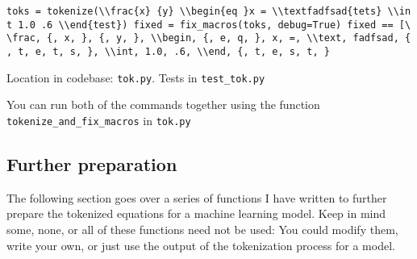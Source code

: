 \documentclass[]{article}
\begin{document}
\texttt{toks\ =\ tokenize(\textquotesingle{}\textbackslash{}\textbackslash{}frac\{x\}\ \{y\}\ \textbackslash{}\textbackslash{}begin\{eq\ \}x\ =\ \textbackslash{}\textbackslash{}textfadfsad\{tets\}\ \textbackslash{}\textbackslash{}int\ 1.0\ .6\ \textbackslash{}\textbackslash{}end\{test\}\textquotesingle{})\ fixed\ =\ fix\_macros(toks,\ debug=True)\ fixed\ ==\ {[}\textquotesingle{}\textbackslash{}\textbackslash{}frac\textquotesingle{},\ \textquotesingle{}\{\textquotesingle{},\ \textquotesingle{}x\textquotesingle{},\ \textquotesingle{}\}\textquotesingle{},\ \textquotesingle{}\{\textquotesingle{},\ \textquotesingle{}y\textquotesingle{},\ \textquotesingle{}\}\textquotesingle{},\ \textquotesingle{}\textbackslash{}\textbackslash{}begin\textquotesingle{},\ \textquotesingle{}\{\textquotesingle{},\ \textquotesingle{}e\textquotesingle{},\ \textquotesingle{}q\textquotesingle{},\ \textquotesingle{}\}\textquotesingle{},\ \textquotesingle{}x\textquotesingle{},\ \textquotesingle{}=\textquotesingle{},\ \textquotesingle{}\textbackslash{}\textbackslash{}text\textquotesingle{},\ \textquotesingle{}fadfsad\textquotesingle{},\ \textquotesingle{}\{\textquotesingle{},\ \textquotesingle{}t\textquotesingle{},\ \textquotesingle{}e\textquotesingle{},\ \textquotesingle{}t\textquotesingle{},\ \textquotesingle{}s\textquotesingle{},\ \textquotesingle{}\}\textquotesingle{},\ \textquotesingle{}\textbackslash{}\textbackslash{}int\textquotesingle{},\ \textquotesingle{}1.0\textquotesingle{},\ \textquotesingle{}.6\textquotesingle{},\ \textquotesingle{}\textbackslash{}\textbackslash{}end\textquotesingle{},\ \textquotesingle{}\{\textquotesingle{},\ \textquotesingle{}t\textquotesingle{},\ \textquotesingle{}e\textquotesingle{},\ \textquotesingle{}s\textquotesingle{},\ \textquotesingle{}t\textquotesingle{},\ \textquotesingle{}\}\textquotesingle{}{]}}

Location in codebase: \texttt{tok.py}. Tests in \texttt{test\_tok.py}

You can run both of the commands together using the function
\texttt{tokenize\_and\_fix\_macros} in \texttt{tok.py}

\hypertarget{further-preparation}{%
\subsection{Further preparation}\label{further-preparation}}

The following section goes over a series of functions I have written to
further prepare the tokenized equations for a machine learning model.
Keep in mind some, none, or all of these functions need not be used: You
could modify them, write your own, or just use the output of the
tokenization process for a model.
\end{document}
